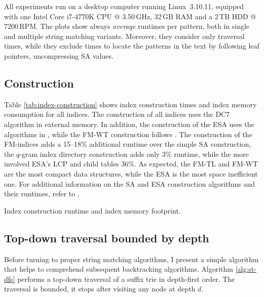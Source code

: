 All experiments run on a desktop computer running Linux~3.10.11, equipped with one Intel\textsuperscript{\textregistered} Core i7-4770K CPU @ 3.50\,GHz, 32\,GB RAM and a 2\,TB HDD @ 7200\,RPM.
The plots show always \emph{average} runtimes per pattern, both in single and multiple string matching variants.
Moreover, they consider only traversal times, while they exclude times to locate the patterns in the text by following leaf pointers, \eg uncompressing SA values.

\subsection{Construction}
\label{sec:index:algo:construction}

Table \ref{tab:index-construction} shows index construction times and index memory consumption for all indices.
The construction of all indices uses the DC7 algorithm \citep{Dementiev2008} in external memory.
In addition, the construction of the ESA uses the algorithms in \citep{Kasai2001,Abouelhoda2004}, while the FM-WT construction follows \citep{Grossi2003}.
The construction of the FM-indices adds a 15--18\% additional runtime over the simple SA construction, the $q$-gram index directory construction adds only 3\% runtime, while the more involved ESA's LCP and child tables 36\%.
As expected, the FM-TL and FM-WT are the most compact data structures, while the ESA is the most space inefficient one.
For additional information on the SA and ESA construction algorithms and their runtimes, refer to \citep{Weese2013}.

\begin{table}[h]
\begin{center}
\caption[Index construction runtime and index memory footprint]{Index construction runtime and index memory footprint.}
\sffamily

\label{tab:index-construction}
\end{center}
\end{table}

\subsection{Top-down traversal bounded by depth}
\label{sec:index:algo:traversal}

Before turning to proper string matching algorithms, I present a simple algorithm that helps to comprehend subsequent backtracking algorithms.
Algorithm \ref{alg:st-dfs} performs a top-down traversal of a suffix trie in depth-first order.
The traversal is bounded, \ie it stops after visiting any node at depth $d$.

